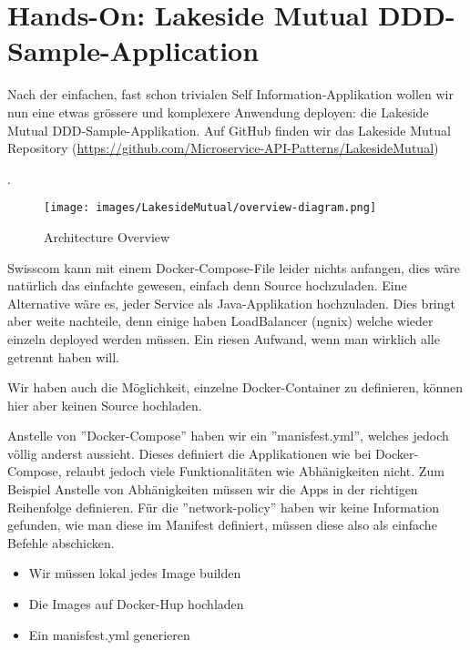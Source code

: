 \documentclass[11pt,titlepage]{article}
\begin{document}
\section{Hands-On: Lakeside Mutual DDD-Sample-Application}
\label{sec:handsOnLakesideMutual}

Nach der einfachen, fast schon trivialen Self Information-Applikation wollen wir nun eine etwas grössere und komplexere Anwendung deployen: die Lakeside Mutual DDD-Sample-Applikation.
Auf GitHub finden wir das Lakeside Mutual Repository (\url{https://github.com/Microservice-API-Patterns/LakesideMutual})\par\medskip.

\begin{figure}[H]
  \begin{center}
    \texttt{[image: images/LakesideMutual/overview-diagram.png]}
    \caption{Architecture Overview}
    \label{fig:cflsmArchOverview}
  \end{center}
\end{figure}

Swisscom kann mit einem Docker-Compose-File leider nichts anfangen, dies wäre natürlich das einfachte gewesen, einfach denn Source hochzuladen.
Eine Alternative wäre es, jeder Service als Java-Applikation hochzuladen. 
Dies bringt aber weite nachteile, denn einige haben LoadBalancer (ngnix) welche wieder einzeln deployed werden müssen. 
Ein riesen Aufwand, wenn man wirklich alle getrennt haben will.

Wir haben auch die Möglichkeit, einzelne Docker-Container zu definieren, können hier aber keinen Source hochladen. 

Anstelle von ''Docker-Compose'' haben wir ein ''manisfest.yml'', welches jedoch völlig anderst aussieht. 
Dieses definiert die Applikationen wie bei Docker-Compose, relaubt jedoch viele Funktionalitäten wie Abhänigkeiten nicht. 
Zum Beispiel Anstelle von Abhänigkeiten müssen wir die Apps in der richtigen Reihenfolge definieren.
Für die ''network-policy'' haben wir keine Information gefunden, wie man diese im Manifest definiert, müssen diese also als einfache Befehle abschicken.

\begin{itemize}
  \item Wir müssen lokal jedes Image builden
  \item Die Images auf Docker-Hup hochladen
  \item Ein manisfest.yml generieren
\end{itemize}
\end{document}
